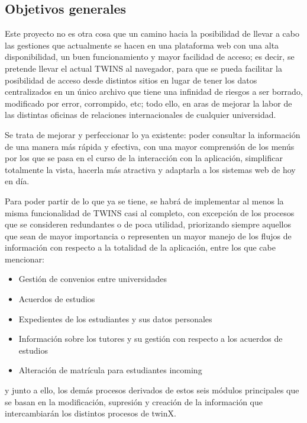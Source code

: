 \documentclass[12pt]{article}
\begin{document}
\subsection{Objetivos generales}

Este proyecto no es otra cosa que un camino hacia la posibilidad de llevar a cabo las gestiones que actualmente se hacen en una plataforma web con una alta disponibilidad, un buen funcionamiento y mayor facilidad de acceso; es decir, se pretende llevar el actual TWINS al navegador, para que se pueda facilitar la posibilidad de acceso desde distintos sitios en lugar de tener los datos centralizados en un único archivo que tiene una infinidad de riesgos a ser borrado, modificado por error, corrompido, etc; todo ello, en aras de mejorar la labor de las distintas oficinas de relaciones internacionales de cualquier universidad.

Se trata de mejorar y perfeccionar lo ya existente: poder consultar la información de una manera más rápida y efectiva, con una mayor comprensión de los menús por los que se pasa en el curso de la interacción con la aplicación, simplificar totalmente la vista, hacerla más atractiva y adaptarla a los sistemas web de hoy en día.

Para poder partir de lo que ya se tiene, se habrá de implementar al menos la misma funcionalidad de TWINS casi al completo, con excepción de los procesos que se consideren redundantes o de poca utilidad, priorizando siempre aquellos que sean de mayor importancia o representen un mayor manejo de los flujos de información con respecto a la totalidad de la aplicación, entre los que cabe mencionar:

\begin{itemize}
	\item Gestión de convenios entre universidades
	\item Acuerdos de estudios
	\item Expedientes de los estudiantes y sus datos personales
	\item Información sobre los tutores y su gestión con respecto a los acuerdos de estudios
	\item Alteración de matrícula para estudiantes incoming
\end{itemize}

y junto a ello, los demás procesos derivados de estos seis módulos principales que se basan en la modificación, supresión y creación de la información que intercambiarán los distintos procesos de twinX.
\end{document}

